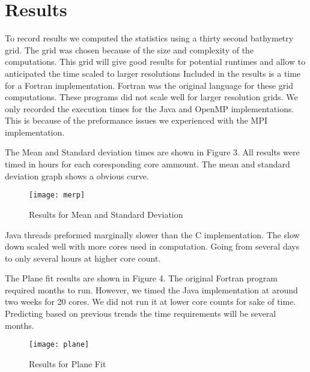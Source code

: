 \section{Results}
To record results we computed the statistics using a thirty second bathymetry grid.
The grid was chosen because of the size and complexity of the computations.
This grid will give good results for potential runtimes and allow to anticipated the time scaled to larger resolutions
Included in the results is a time for a Fortran implementation.
Fortran was the original language for these grid computations.
These programs did not scale well for larger resolution grids.
We only recorded the execution times for the Java and OpenMP implementations.
This is because of the preformance issues we experienced with the MPI implementation.

\par
The Mean and Standard deviation times are shown in Figure 3.
All results were timed in hours for each coresponding core ammount.
The mean and standard deviation graph shows a obvious curve.
\begin{figure}[h]
    \centering
    \texttt{[image: merp]}
    \caption{Results for Mean and Standard Deviation}
\end{figure}

\par
Java threads preformed marginally slower than the C implementation.
The slow down scaled well with more cores used in computation.
Going from several days to only several hours at higher core count.

\par
The Plane fit results are shown in Figure 4.
The original Fortran program required months to run.
However, we timed the Java implementation at around two weeks for 20 cores.
We did not run it at lower core counts for sake of time.
Predicting based on previous trends the time requirements will be several months.

\begin{figure}[h]
    \centering
    \texttt{[image: plane]}
    \caption{Results for Plane Fit}
\end{figure}

